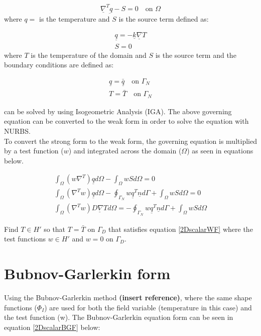 \documentclass[a4paper]{report}
\begin{document}
	\begin{equation}
		\underline{\nabla}^T \underbar{q} - S = 0 \quad \text{on $\Omega$} 
		\label{governing2Dscalar}
	\end{equation}
	where $q=$ is the temperature and $S$ is the source term defined as:
		
	\begin{eqnarray}
		\underline{q}=-\underline{k}\underline{\nabla}T \\
		S = 0
	\end{eqnarray}
	where $T$ is the temperature of the domain and $S$ is the source term and the boundary conditions are defined as:
	
	\begin{eqnarray}
		\underline{q}=\bar{\underline{q}}  \quad \text{on $\Gamma_N$} \\
		T=\bar{T}  \quad \text{on $\Gamma_N$}
	\end{eqnarray}
	
	\noindent can be solved by using Isogeometric Analysis (IGA). The above governing equation can be converted to the weak form in order to solve the equation with NURBS. \\
	
	\noindent To convert the strong form to the weak form, the governing equation is multiplied by a test function ($w$) and integrated across the domain ($\Omega$) as seen in equations below. 
	
	\begin{eqnarray}
		\int_{\Omega} (w \nabla^T) \underline{q}  d\Omega - \int_{\Omega} wS d\Omega  =0\\
		\int_{\Omega} (\nabla^T w) \underline{q}  d\Omega - \oint_{\Gamma_N} w\underline{q}^T \underline{n} d\Gamma + \int_{\Omega} wS d\Omega =0 \\
		\int_{\Omega} (\nabla^T w) \underline{D\nabla T}  d\Omega = - \oint_{\Gamma_N} w\underline{q}^T \underline{n} d\Gamma + \int_{\Omega} wS d\Omega  
		\label{2DscalarWF}
	\end{eqnarray}
	
	\noindent Find $T \in H'$ so that $T=\bar{T}$ on $\Gamma_D$ that satisfies equation \ref{2DscalarWF} where the test functions $w\in H'$ and $w=0$ on $\Gamma_D$.

\section{Bubnov-Garlerkin form}
	
	Using the Bubnov-Garlerkin method \textbf{(insert reference)}, where the same shape functions ($\Phi_I$) are used for both the field variable (temperature in this case) and the test function (w). The Bubnov-Garlerkin equation form can be seen in equation \ref{2DscalarBGF} below:
	
\end{document}

